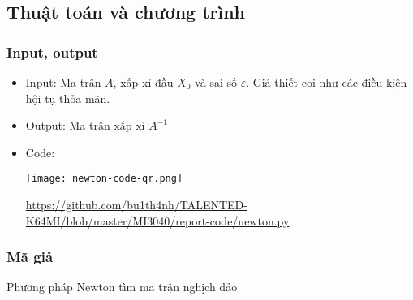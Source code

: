     \subsection{Thuật toán và chương trình}
    \begin{frame}
        \frametitle{Input, output}
        \begin{itemize}
            \item Input: Ma trận $A$, xấp xỉ đầu $X_{0}$ và sai số $\varepsilon$. Giả thiết coi như các điều kiện hội tụ thỏa mãn.
            \item Output: Ma trận xấp xỉ $A^{-1}$
            \item Code:
            \begin{center}
                \texttt{[image: newton-code-qr.png]}

                \url{https://github.com/bu1th4nh/TALENTED-K64MI/blob/master/MI3040/report-code/newton.py}
            \end{center}
        \end{itemize}
    \end{frame}

    \begin{frame}[fragile]  
        \frametitle{Mã giả}

        \IncMargin{1em}\begin{algorithm}[H]
            \caption{Phương pháp Newton tìm ma trận nghịch đảo \label{IR}}
            \SetAlgoLined            
        \end{algorithm}\DecMargin{1em}
    \end{frame}

